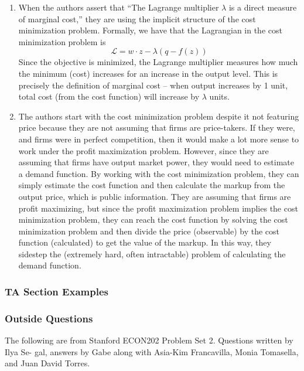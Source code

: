 \documentclass[12pt]{article}
\begin{document}
\begin{enumerate}
	\begin{enumerate}
		\item When the authors assert that ``The Lagrange multiplier $\lambda$ is a direct measure of marginal cost,'' they are using the implicit structure of the cost minimization problem. Formally, we have that the Lagrangian in the cost minimization problem is
		\[
		\mathcal{L} = w \cdot z - \lambda (q - f(z))
		\]
		Since the objective is minimized, the Lagrange multiplier measures how much the minimum (cost) increases for an increase in the output level. This is precisely the definition of marginal cost -- when output increases by 1 unit, total cost (from the cost function) will increase by $\lambda$ units.
		\item The authors start with the cost minimization problem despite it not featuring price because they are not assuming that firms are price-takers. If they were, and firms were in perfect competition, then it would make a lot more sense to work under the profit maximization problem. However, since they are assuming that firms have output market power, they would need to estimate a demand function. By working with the cost minimization problem, they can simply estimate the cost function and then calculate the markup from the output price, which is public information. They are assuming that firms are profit maximizing, but since the profit maximization problem implies the cost minimization problem, they can reach the cost function by solving the cost minimization problem and then divide the price (observable) by the cost function (calculated) to get the value of the markup. In this way, they sidestep the (extremely hard, often intractable) problem of calculating the demand function.
	\end{enumerate}
\end{enumerate}

\subsubsection{TA Section Examples}

\subsubsection{Outside Questions}

The following are from Stanford ECON202 Problem Set 2. Questions written by Ilya Se- gal, answers by Gabe along with Asia-Kim Francavilla, Monia Tomasella, and Juan David Torres.
\end{document}

